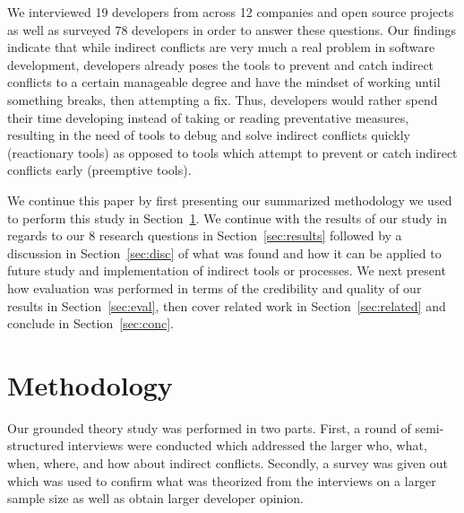 \documentclass[conference]{IEEEtran}
\begin{document}
We interviewed 19 developers from across 12 companies and open source projects as well as surveyed 78 
developers in order to answer these questions. Our findings indicate that while indirect conflicts are very much a real problem
in software development, developers already poses the tools to prevent and catch indirect conflicts to a certain manageable degree and have
the mindset of working until something breaks, then attempting a fix. Thus, developers would rather spend their time developing instead
of taking or reading preventative measures, resulting in the need of tools to debug and solve indirect conflicts quickly
(reactionary tools) as opposed to tools which attempt to prevent or catch indirect conflicts early (preemptive tools).

We continue this paper by first presenting our summarized methodology we used to perform this study in Section~\ref{sec:meth}. We
continue with the results of our study in regards to our 8 research questions in Section~\ref{sec:results} 
followed by a discussion in Section~\ref{sec:disc} of what was found and how it can be applied to future study and implementation
of indirect tools or processes. We next present how evaluation was performed in terms of the credibility
and quality of our results in Section~\ref{sec:eval}, then cover related work in Section~\ref{sec:related}
and conclude in Section~\ref{sec:conc}.

\section{Methodology}
\label{sec:meth}

Our grounded theory study was performed in two parts. First, a round of semi-structured interviews were conducted which 
addressed the larger who, what, when, where, and how about indirect conflicts. Secondly, a survey was given
out which was used to confirm what was theorized from the interviews on a larger sample size as well as obtain
larger developer opinion.
\end{document}
